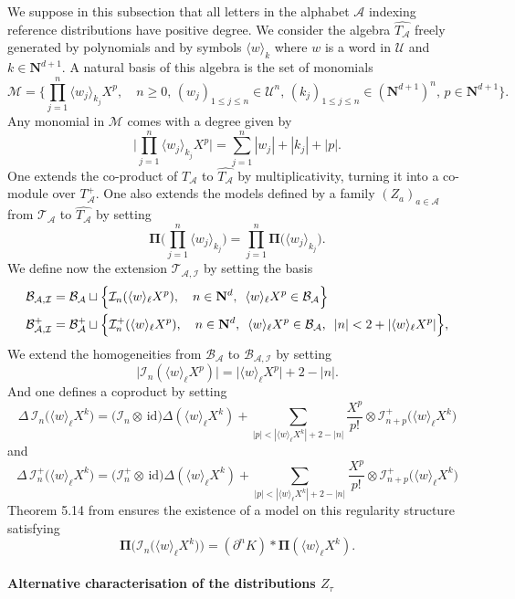 \documentclass[11pt]{preprint}
\def\id{\mathrm{id}}
\newcommand{\mcM}{\mathcal{M}}
\newcommand{\mcA}{\mathcal{A}}
\newcommand{\mcB}{\mathcal{B}}
\newcommand{\mcU}{\mathcal{U}}
\newcommand{\mcI}{\mathcal{I}}
\def\PPi{\boldsymbol{\Pi}}
\renewcommand{\lg}{\langle}
\newcommand{\rg}{\rangle}
\newcommand{\bfN}{\mathbf{N}}
\newcommand{\scrT}{\mathscr{T}}
\begin{document}
We suppose in this subsection that all letters in the alphabet $\mcA$ indexing reference distributions have positive degree. We consider the algebra $\widehat{T_\mcA}$ freely generated by polynomials and by symbols $\lg w \rg_k$ where $w$ is a word in $\mcU$ and $k\in\bfN^{d+1}$. A natural basis of this algebra is the set of monomials
$$
\mcM = \Big\{  \prod_{j=1}^n \lg w_j \rg_{k_j} X^p,\quad n\geq 0, \,  (w_j)_{1\leq j\leq n}\in\mcU^n   ,\, (k_j)_{1\leq j\leq n}\in(\bfN^{d+1})^n,\, p\in \bfN^{d+1}  \Big\}.
$$
Any monomial in $\mcM$ comes with a degree given by 
$$
\Big| \prod_{j=1}^n \lg w_j \rg_{k_j}X^p \Big| = \sum_{j=1}^n |w_j|+|k_j|+|p|.
$$
One extends the co-product of $T_\mcA$ to $\widehat{T_\mcA}$ by multiplicativity, turning it into a co-module over $T_\mcA^+$.
One also extends the models defined by a family $(Z_a)_{a\in\mcA}$ from  $\scrT_\mcA$ to $\widehat{T_\mcA}$ by setting
$$
{\PPi}\Big( \prod_{j=1}^n\lg w_j \rg_{k_j} \Big) = \prod_{j=1}^n { \PPi}\big( \lg w_j\rg_{k_j} \big).
$$
We define now the extension $\scrT_{\mcA,\mcI}$ by setting the basis 
\begin{align*}
	\mcB_{\mcA,\mcI}&= \mcB_\mcA \sqcup \Big\{ \mcI_n( \lg w\rg_\ell X^p ), \quad n\in\bfN^d, \enskip \lg w\rg_\ell X^p\in\mcB_\mcA   \Big\}  
	\\
	\mcB_{\mcA,\mcI}^+ &= \mcB_\mcA^+ \sqcup \Big\{ \mcI_n^+( \lg w\rg_\ell X^p ), \quad n\in\bfN^d, \enskip \lg w\rg_\ell X^p\in\mcB_\mcA, \enskip |n|<2 + |\lg w\rg_\ell X^p|  \Big\},
\end{align*}
We extend the homogeneities from $\mcB_\mcA$ to $\mcB_{\mcA,\mcI}$ by setting
$$
\big|  \mcI_n( \lg w\rg_\ell X^p )  \big| = \big| \lg w\rg_\ell X^p   \big| + 2 - |n|.
$$
And one defines a coproduct by setting
$$
\Delta \,  \mcI_n \big( \lg w\rg_\ell X^k \big) = \big(  \mcI_n \otimes \, \id  \big) \Delta(\lg w\rg_\ell X^k) +\sum_{|p|<|\lg w\rg_\ell X^k|+2-|n|}  \frac{X^p}{p!} \otimes \mcI_{n+p}^+ \big( \lg w\rg_\ell X^k \big) 
$$
and 
$$
\Delta \,  \mcI_n^+ \big( \lg w\rg_\ell X^k \big) = \big( \mcI_n^+ \otimes \,  \id  \big) \Delta(\lg w\rg_\ell X^k) +\sum_{|p|<|\lg w\rg_\ell X^k|+2-|n|}  \frac{X^p}{p!} \otimes   \mcI_{n+p}^+ \big( \lg w\rg_\ell X^k \big) 
$$
Theorem 5.14 from \cite{Hai14} ensures the existence of a model on this regularity structure satisfying 
$$
{\PPi}\Big(\mcI_n \big( \lg w \rg_\ell X^k \big)\Big)= (\partial^n K) * {\PPi}\left(\lg w \rg_\ell X^k\right).
$$
	
\paragraph{Alternative characterisation of the distributions $Z_\tau$}	
	
\end{document}
